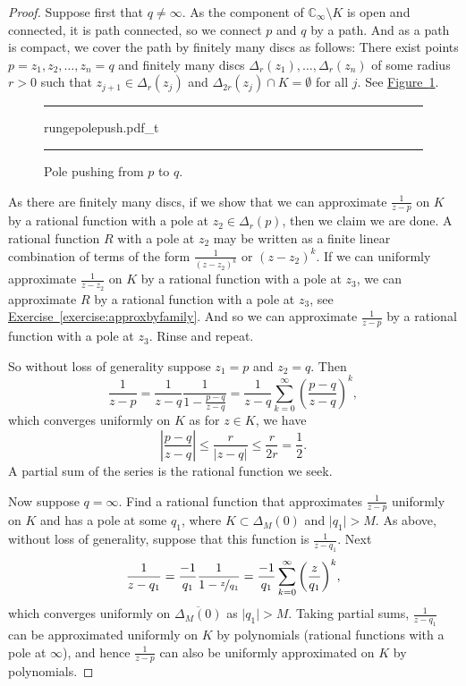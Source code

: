 \documentclass[12pt,openany]{book}
\newcommand{\sabs}[1]{\lvert {#1} \rvert}
\newcommand{\abs}[1]{\left\lvert {#1} \right\rvert}
\newcommand{\C}{{\mathbb{C}}}
\theoremstyle{plain}
\theoremstyle{remark}
\theoremstyle{definition}
\newenvironment{myfig}{%
\begin{figure}[h!t]
\noindent\rule{\textwidth}{0.5pt}\vspace{12pt}\par\centering}%
{\par\noindent\rule{\textwidth}{0.5pt}
\end{figure}}
\theoremstyle{exercise}
\theoremstyle{example}
\newcommand{\figureref}[1]{\hyperref[#1]{Figure~\ref*{#1}}}
\newcommand{\exerciseref}[1]{\hyperref[#1]{Exercise~\ref*{#1}}}
\begin{document}
\begin{proof}
Suppose first that $q \not= \infty$.
As the component of $\C_\infty \setminus K$ is open and connected, it is
path connected,
so we connect $p$ and $q$ by a path.
And as a path is compact,
we cover the path by finitely many discs as follows: 
There exist points $p=z_1,z_2,\ldots,z_n=q$ and
finitely many discs $\Delta_{r}(z_1),\ldots,\Delta_{r}(z_n)$
of some radius $r > 0$
such that $z_{j+1} \in \Delta_{r}(z_j)$
and $\Delta_{2r}(z_j) \cap K = \emptyset$ for all $j$.
See \figureref{fig:rungepolepush}.

\begin{myfig}
{rungepolepush.pdf_t}
\caption{Pole pushing from $p$ to $q$.\label{fig:rungepolepush}}
\end{myfig}

As there are finitely many discs, if we show that we can approximate
$\frac{1}{z-p}$ on $K$ by a rational function with a pole at $z_2 \in
\Delta_r(p)$, then we claim we are done.  A rational function $R$ with a pole
at $z_2$ may be written as
a finite linear combination of terms of the form $\frac{1}{{(z-z_2)}^k}$
or $(z-z_2)^k$.  If we can uniformly approximate $\frac{1}{z-z_2}$ on $K$ by a rational
function with a pole at $z_3$, we can approximate $R$ by a rational function
with a pole at $z_3$, see \exerciseref{exercise:approxbyfamily}.
And so we can approximate $\frac{1}{z-p}$ by a rational function with a pole at $z_3$.
Rinse and repeat.

So without loss of generality suppose $z_1=p$ and $z_2=q$.
Then
\begin{equation*}
\frac{1}{z-p}
=
\frac{1}{z-q}
\frac{1}{1-\frac{p-q}{z-q}}
=
\frac{1}{z-q}
\sum_{k=0}^\infty
{\left(\frac{p-q}{z-q}\right)}^k ,
\end{equation*}
which converges uniformly on $K$ as for $z \in K$, we have
\begin{equation*}
\abs{\frac{p-q}{z-q}}
\leq 
\frac{r}{\sabs{z-q}}
\leq
\frac{r}{2r} = \frac{1}{2} .
\end{equation*}
A partial sum of the series is the rational function we seek.

Now suppose $q =\infty$. Find a rational function
that approximates $\frac{1}{z-p}$ uniformly on $K$ and has a pole
at some $q_1$, where
$K \subset \Delta_M(0)$ and $\sabs{q_1} > M$.
As above, without loss of generality, suppose that this function
is $\frac{1}{z-q_1}$.
Next
\begin{equation*}
\frac{1}{z-q_1}
=
\frac{-1}{q_1}
\frac{1}{1-\nicefrac{z}{q_1}}
=
\frac{-1}{q_1}
\sum_{k=0}^\infty
{\left(\frac{z}{q_1}\right)}^k ,
\end{equation*}
which converges uniformly on $\overline{\Delta_M(0)}$ as  $\sabs{q_1} > M$.
Taking partial sums, $\frac{1}{z-q_1}$ can be approximated
uniformly on $K$ by polynomials (rational functions with a pole at
$\infty$),
and hence $\frac{1}{z-p}$ can also be uniformly approximated on $K$ by polynomials.
\end{proof}
\end{document}
